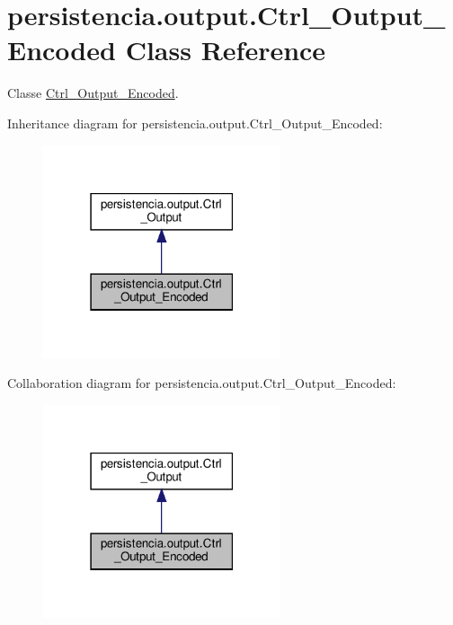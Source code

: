 \hypertarget{classpersistencia_1_1output_1_1Ctrl__Output__Encoded}{}\section{persistencia.\+output.\+Ctrl\+\_\+\+Output\+\_\+\+Encoded Class Reference}
\label{classpersistencia_1_1output_1_1Ctrl__Output__Encoded}


Classe \hyperlink{classpersistencia_1_1output_1_1Ctrl__Output__Encoded}{Ctrl\+\_\+\+Output\+\_\+\+Encoded}.  




Inheritance diagram for persistencia.\+output.\+Ctrl\+\_\+\+Output\+\_\+\+Encoded\+:
\nopagebreak
\begin{figure}[H]
\begin{center}
\leavevmode
\includegraphics[width=198pt]{classpersistencia_1_1output_1_1Ctrl__Output__Encoded__inherit__graph}
\end{center}
\end{figure}


Collaboration diagram for persistencia.\+output.\+Ctrl\+\_\+\+Output\+\_\+\+Encoded\+:
\nopagebreak
\begin{figure}[H]
\begin{center}
\leavevmode
\includegraphics[width=198pt]{classpersistencia_1_1output_1_1Ctrl__Output__Encoded__coll__graph}
\end{center}
\end{figure}
